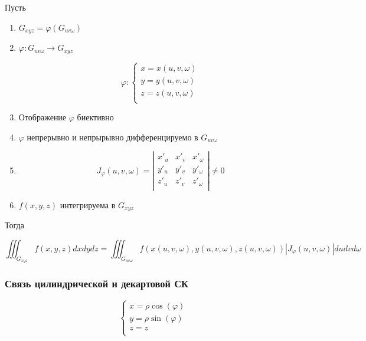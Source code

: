 \documentclass[a4paper, 14pt]{report}
\begin{document}
\begin{theorem}
    Пусть

    \begin{enumerate}
        \item $G_{xyz} = \varphi(G_{uv\omega})$
        \item $\varphi: G_{uv\omega} \to G_{xyz}$

            $$
            \varphi : 
            \begin{cases}
                x = x(u, v, \omega) \\
                y = y(u, v, \omega) \\
                z = z(u, v, \omega) \\
            \end{cases}
            $$

        \item Отображение $\varphi$ биективно
        \item $\varphi$ непрерывно и непрырывно дифференцируемо в $G_{uv\omega}$
        \item 
            $$
            J_\varphi(u,v,\omega) = \left|
            \begin{matrix}
                x'_u & x'_v & x'_\omega \\
                y'_u & y'_v & y'_\omega \\
                z'_u & z'_v & z'_\omega \\
            \end{matrix}
            \right| \ne 0
            $$
        \item $f(x,y,z)$ интегрируема в $G_{xyz}$
    \end{enumerate}

    Тогда

    $$
    \iiint_{G_{xyz}} f(x,y,z)dxdydz = \iiint_{G_{uv\omega}} f(x(u,v,\omega), y(u,v,\omega), z(u,v,\omega)) |J_\varphi(u,v,\omega)| dudvd\omega
    $$
\end{theorem}

\subsubsection{Связь цилиндрической и декартовой СК}

$$
\begin{cases}
    x = \rho \cos(\varphi) \\
    y = \rho \sin(\varphi) \\
    z = z \\
\end{cases}
$$
\end{document}
